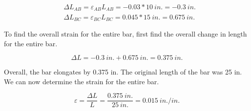 \documentclass[
  letterpaper,
  DIV=11,
  numbers=noendperiod]{scrreprt}
\theoremstyle{definition}
\theoremstyle{remark}
\begin{document}
\begin{tcolorbox}
\begin{tcolorbox}
\[
\begin{aligned}
& \Delta L_{A B}=\varepsilon_{A B} L_{A B}=-0.03 * 10{~in.}=-0.3{~in.} \\
& \Delta L_{B C}=\varepsilon_{B C} L_{B C}=0.045 * 15{~in.}=0.675{~in.}
\end{aligned}
\]

To find the overall strain for the entire bar, first find the overall
change in length for the entire bar.

\[
\Delta L=-0.3{~in.}+0.675{~in.}=0.375{~in.}
\]

Overall, the bar elongates by 0.375 in. The original length of the bar
was 25 in. We can now determine the strain for the entire bar.

\[
\varepsilon=\frac{\Delta L}{L}=\frac{0.375{~in.}}{25{~in.}}=0.015{~in./in.}
\]

\end{tcolorbox}

\end{tcolorbox}
\end{document}
